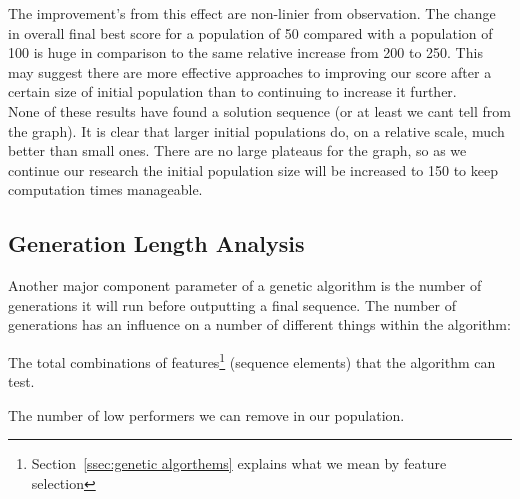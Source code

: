 The improvement's from this effect are non-linier from observation.
The change in overall final best score for a population of 50 compared with a population of 100 is huge in comparison to the same relative increase from 200 to 250.
This may suggest there are more effective approaches to improving our score after a certain size of initial population than to continuing to increase it further. \\



None of these results have found a solution sequence (or at least we cant tell from the graph). 
It is clear that larger initial populations do, on a relative scale, much better than small ones.
There are no large plateaus for the graph, so as we continue our research the initial population size will be increased to 150 to keep computation times manageable.\\


\subsection{Generation Length Analysis}
Another major component parameter of a genetic algorithm is the number of generations it will run before outputting a final sequence.
The number of generations has an influence on a number of different things within the algorithm: 
\begin{itemize}
    \begin{item}
        The total combinations of features\footnote{Section~\ref{ssec:genetic algorthems} explains what we mean by feature selection} (sequence elements) that the algorithm can test.
    \end{item}
    \begin{item}
        The number of low performers we can remove in our population.
    \end{item}
\end{itemize}

